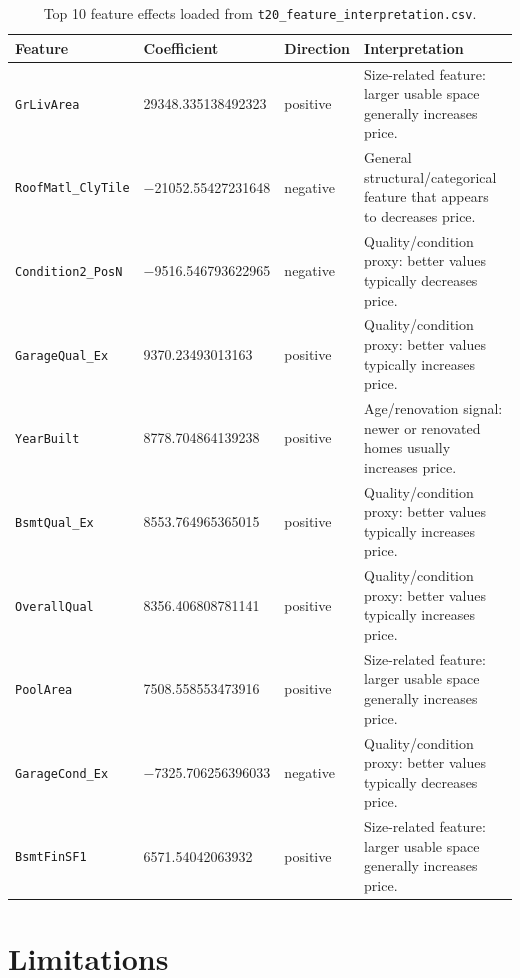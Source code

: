 \documentclass[12pt,a4paper]{article}
\newcommand{\fmtpred}[1]{\num[round-mode=places,round-precision=2,group-separator={}]{#1}}
\begin{document}
\begin{table}[H]
\centering
\caption{Top 10 feature effects loaded from \texttt{t20\_feature\_interpretation.csv}.}
\label{tab:feature-interpretation}
\small
\begin{tabular}{lllp{}}
\toprule
\textbf{Feature} & \textbf{Coefficient} & \textbf{Direction} & \textbf{Interpretation}\\
\midrule
\nolinkurl{GrLivArea} & \fmtpred{29348.335138492323} & positive & Size-related feature: larger usable space generally increases price.\\
\nolinkurl{RoofMatl_ClyTile} & \fmtpred{-21052.55427231648} & negative & General structural/categorical feature that appears to decreases price.\\
\nolinkurl{Condition2_PosN} & \fmtpred{-9516.546793622965} & negative & Quality/condition proxy: better values typically decreases price.\\
\nolinkurl{GarageQual_Ex} & \fmtpred{9370.23493013163} & positive & Quality/condition proxy: better values typically increases price.\\
\nolinkurl{YearBuilt} & \fmtpred{8778.704864139238} & positive & Age/renovation signal: newer or renovated homes usually increases price.\\
\nolinkurl{BsmtQual_Ex} & \fmtpred{8553.764965365015} & positive & Quality/condition proxy: better values typically increases price.\\
\nolinkurl{OverallQual} & \fmtpred{8356.406808781141} & positive & Quality/condition proxy: better values typically increases price.\\
\nolinkurl{PoolArea} & \fmtpred{7508.558553473916} & positive & Size-related feature: larger usable space generally increases price.\\
\nolinkurl{GarageCond_Ex} & \fmtpred{-7325.706256396033} & negative & Quality/condition proxy: better values typically decreases price.\\
\nolinkurl{BsmtFinSF1} & \fmtpred{6571.54042063932} & positive & Size-related feature: larger usable space generally increases price.\\
\bottomrule
\end{tabular}
\end{table}

\section{Limitations}
\label{sec:limitations}
\end{document}

